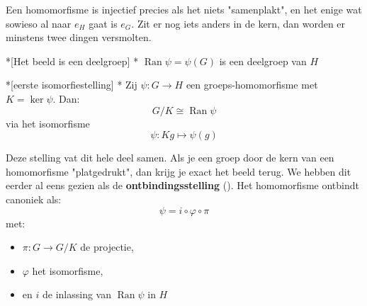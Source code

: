 \textbf{} Een homomorfisme is injectief precies als het niets "samenplakt", en het enige wat sowieso al naar $e_H$ gaat is $e_G$. Zit er nog iets anders in de kern, dan worden er minstens twee dingen versmolten.

\begin{nicetheorem}*[Het beeld is een deelgroep]
    \nextpart[]*
    $\operatorname{Ran} \psi = \psi(G)$ is een deelgroep van $H$
\end{nicetheorem}

\begin{nicetheorem}*[eerste isomorfiestelling]
    \nextpart[]*
    Zij $\psi: G \to H$ een groeps-homomorfisme met $K = \operatorname{ker}\psi$. Dan:
    \begin{equation*}
        G/K \cong \operatorname{Ran}\psi
    \end{equation*}
    via het isomorfisme
    \begin{equation*}
        \psi: Kg \mapsto \psi(g)
    \end{equation*}
\end{nicetheorem}

\textbf{} Deze stelling vat dit hele deel samen. Als je een groep door de kern van een homomorfisme "platgedrukt", dan krijg je exact het beeld terug. We hebben dit eerder al eens gezien als de \textbf{ontbindingsstelling} (). Het homomorfisme ontbindt canoniek als:
\begin{equation*}
    \psi = i \circ \varphi \circ \pi
\end{equation*}
met:
\begin{itemize}
    \item $\pi : G \to G/K$ de projectie,
    \item $\varphi$ het isomorfisme,
    \item en $i$ de inlassing van $\operatorname{Ran}\psi$ in $H$
\end{itemize}

\begin{center}
\resizebox{0.99\textwidth}{!}{%
    
}
\end{center}

\textbf{} 


